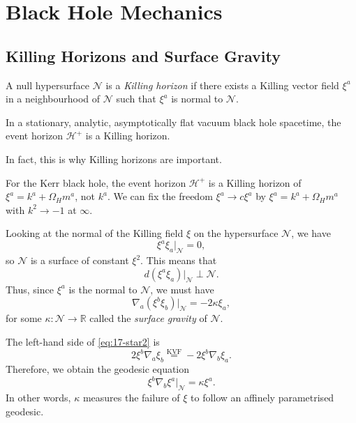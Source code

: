 \chapter{Black Hole Mechanics}%
\label{cha:black_hole_mechanics}

\section{Killing Horizons and Surface Gravity}%
\label{sec:killing_horizons}

\begin{definition}
  A null hypersurface $\mathcal{N}$ is a \emph{Killing horizon} if there exists a Killing vector field $\xi^{a}$ in a neighbourhood of $\mathcal{N}$ such that $\xi^{a}$ is normal to $\mathcal{N}$.
\end{definition}
\begin{theorem}[Hawking '72]
  In a stationary, analytic, asymptotically flat vacuum black hole spacetime, the event horizon $\mathcal{H}^+$ is a Killing horizon.
\end{theorem}
\begin{remark}
  In fact, this is why Killing horizons are important.
\end{remark}

For the Kerr black hole, the event horizon $\mathcal{H}^+$ is a Killing horizon of $\xi^{a} = k^{a} + \Omega_H m^{a}$, not $k^{a}$.
We can fix the freedom $\xi^{a} \to c \xi^{a}$ by $\xi^{a} = k^{a} + \Omega_H m^{a}$ with $k^2 \to -1$ at $\infty$.

Looking at the normal of the Killing field $\xi$ on the hypersurface $\mathcal{N}$, we have
\begin{equation}
  \xi^{a} \xi_{a} \rvert_{\mathcal{N}} = 0,
\end{equation}
so $\mathcal{N}$ is a surface of constant $\xi^2$.
This means that
\begin{equation}
  d (\xi^{a} \xi_{a}) \rvert_{\mathcal{N}} \perp \mathcal{N}.
\end{equation}
Thus, since $\xi^{a}$ is the normal to $\mathcal{N}$, we must have
\begin{equation}
  \nabla_a (\xi^{b} \xi_{b}) \rvert_{\mathcal{N}} = -2 \kappa \xi_{a}, \label{eq:17-star2}
\end{equation}
for some $\kappa \colon \mathcal{N} \to \mathbb{R}$ called the \emph{surface gravity} of $\mathcal{N}$.

The left-hand side of \eqref{eq:17-star2} is
\begin{equation}
  2 \xi^{b} \nabla_a \xi_{b} \stackrel{\text{KVF}}{=} -2 \xi^{b} \nabla_b \xi_{a}.
\end{equation}
Therefore, we obtain the geodesic equation
\begin{equation}
  \xi^{b} \nabla_{b} \xi^{a} \rvert_{\mathcal{N}} = \kappa \xi^{a}.
\end{equation}
In other words, $\kappa$ measures the failure of $\xi$ to follow an affinely parametrised geodesic.

